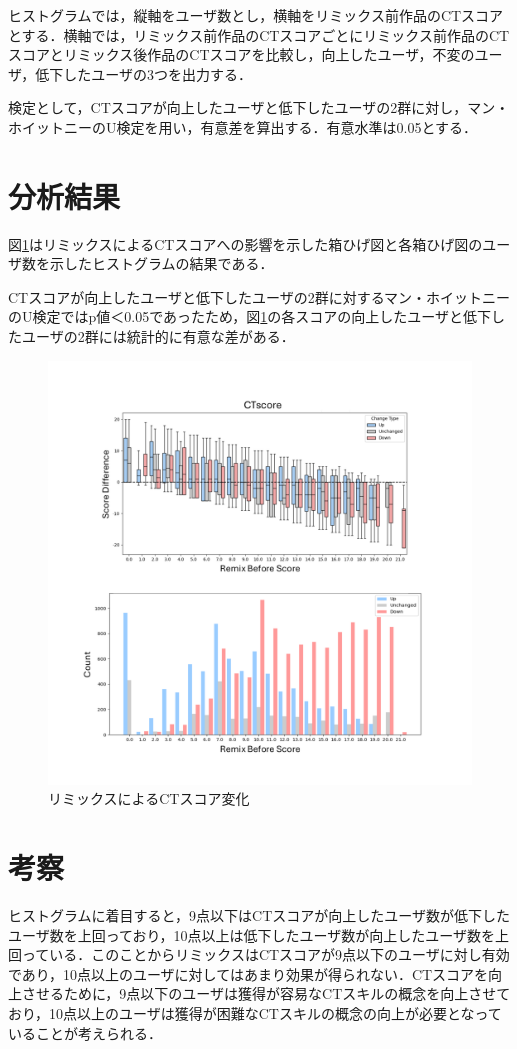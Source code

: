 \documentclass[11pt]{jreport}
\begin{document}
ヒストグラムでは，縦軸をユーザ数とし，横軸をリミックス前作品のCTスコアとする．横軸では，リミックス前作品のCTスコアごとにリミックス前作品のCTスコアとリミックス後作品のCTスコアを比較し，向上したユーザ，不変のユーザ，低下したユーザの3つを出力する．

検定として，CTスコアが向上したユーザと低下したユーザの2群に対し，マン・ホイットニーのU検定を用い，有意差を算出する．有意水準は0.05とする．

\section{分析結果}
図\ref{fig:rq1-CTscore}はリミックスによるCTスコアへの影響を示した箱ひげ図と各箱ひげ図のユーザ数を示したヒストグラムの結果である．

CTスコアが向上したユーザと低下したユーザの2群に対するマン・ホイットニーのU検定ではp値＜0.05であったため，図\ref{fig:rq1-CTscore}の各スコアの向上したユーザと低下したユーザの2群には統計的に有意な差がある．

\begin{figure}[h]
\centerline{\includegraphics[width=0.9\linewidth]{@BSthesis2024_Horio/BSthesis2024_Horio_fig/rq1-CTscore.pdf}}
\caption{リミックスによるCTスコア変化}
\label{fig:rq1-CTscore}
\end{figure}

\section{考察}
ヒストグラムに着目すると，9点以下はCTスコアが向上したユーザ数が低下したユーザ数を上回っており，10点以上は低下したユーザ数が向上したユーザ数を上回っている．このことからリミックスはCTスコアが9点以下のユーザに対し有効であり，10点以上のユーザに対してはあまり効果が得られない．CTスコアを向上させるために，9点以下のユーザは獲得が容易なCTスキルの概念を向上させており，10点以上のユーザは獲得が困難なCTスキルの概念の向上が必要となっていることが考えられる．
\end{document}
